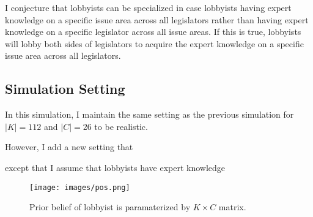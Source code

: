 \documentclass{article}
\begin{document}
I conjecture that lobbyists can be specialized 
in case lobbyists having 
expert knowledge on a specific issue area across all legislators
rather than having expert knowledge 
on a specific legislator across all issue areas.
If this is true, 
lobbyists will lobby both sides of legislators
to acquire 
the expert knowledge on a specific issue area
across all legislators.


\subsection{Simulation Setting}

In this simulation, 
I maintain the same setting as the previous simulation
for $|K|=112$ and $|C|=26$ to be realistic.

However, I add a new setting that 

except that I assume that lobbyists have expert knowledge


\begin{figure}[h]
    \centering
    \texttt{[image: images/pos.png]}
    \caption{Prior belief of lobbyist is paramaterized by $K \times C$ matrix.}
    \label{fig:mesh1}
\end{figure}
\end{document}
